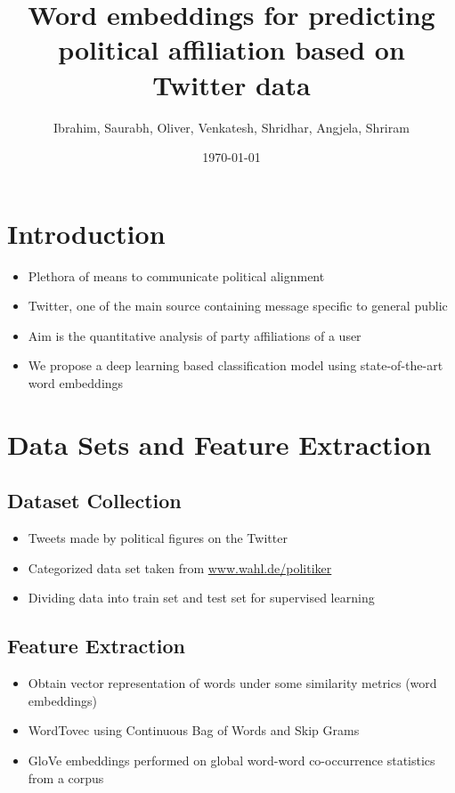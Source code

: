 \documentclass[final]{beamer}
\title
[Machine Learning 1 Conference, Kaiserslautern, Germany ] %
{ %
Word embeddings for predicting political affiliation based on
Twitter data
}
\author{ %
Ibrahim, Saurabh, Oliver, Venkatesh, Shridhar, Angjela, Shriram
}
\institute
[Technische Universität Kaiserslautern] %
{
\inst{1} Technische Universität Kaiserslautern\\[0.3ex]

}
\date{\today}
\begin{document}
\begin{frame}[t]
\begin{multicols}{3}

\section{Introduction}
\begin{itemize}
  \item Plethora of means to communicate political alignment
  \item Twitter, one of the main source containing message specific to general public
  \item Aim is the quantitative analysis of party affiliations of a user
  \item We propose a deep learning based classification model using state-of-the-art word embeddings
\end{itemize}

\section{Data Sets and Feature Extraction}

\subsection{Dataset Collection}
\begin{itemize}
  \item Tweets made by political figures on the Twitter
  \item Categorized data set taken from \href{www.wahl.de/politiker}{www.wahl.de/politiker}
  \item Dividing data into train set and test set for supervised learning
\end{itemize}


\subsection{Feature Extraction}
\begin{itemize}
  \item Obtain vector representation of words under some similarity metrics (word embeddings)
  \item WordTovec using Continuous Bag of Words and Skip Grams
  \item GloVe embeddings performed on global word-word co-occurrence statistics from a corpus
\end{itemize}


\end{multicols}
\end{frame}
\end{document}

